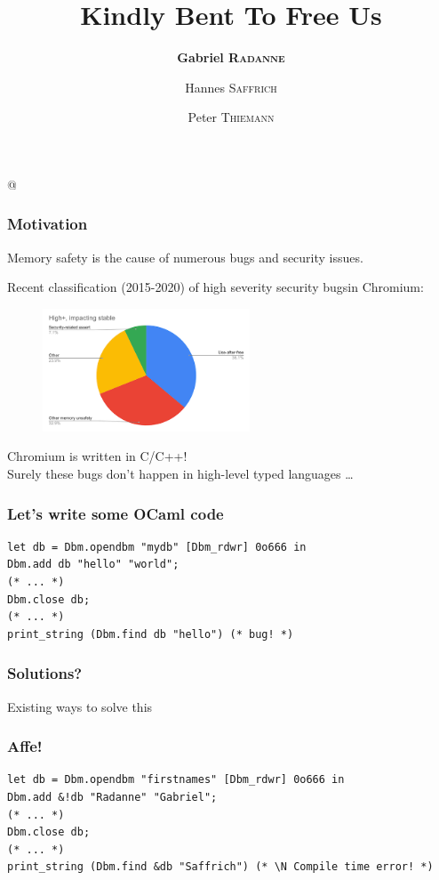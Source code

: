 \documentclass[aspectratio=169,dvipsnames,svgnames,10pt]{beamer}
\title{Kindly Bent To Free Us}
\author{\textbf{Gabriel \textsc{Radanne}}
  \and Hannes \textsc{Saffrich}
  \and Peter \textsc{Thiemann}}
\newcommand\N{{\color{Red}{\ding{56}}}}
\begin{document}
\lstMakeShortInline[keepspaces,basicstyle=\small\ttfamily]@

\frame[plain]{\titlepage}


\begin{frame}
  \frametitle{Motivation}

  Memory safety is the cause of numerous bugs and security issues.
  
  Recent classification (2015-2020) of \og high severity security bugs\fg in Chromium:

  \begin{figure}[h]
    \centering
    \includegraphics[width=0.55\textwidth]
    {chromium-use-after-free}
  \end{figure}

  \pause
  Chromium is written in C/C++!\\
  Surely these bugs don't happen in high-level typed languages \dots
  
\end{frame}

\begin{frame}[fragile]
  \frametitle{Let's write some OCaml code}

\begin{verbatim}
let db = Dbm.opendbm "mydb" [Dbm_rdwr] 0o666 in
Dbm.add db "hello" "world";
(* ... *)
Dbm.close db;
(* ... *)
print_string (Dbm.find db "hello") (* bug! *)
\end{verbatim}
  
\end{frame}

\begin{frame}
  \frametitle{Solutions?}

  Existing ways to solve this
  
\end{frame}

\begin{frame}[fragile]
  \frametitle{Affe!}

\begin{verbatim}
let db = Dbm.opendbm "firstnames" [Dbm_rdwr] 0o666 in
Dbm.add &!db "Radanne" "Gabriel";
(* ... *)
Dbm.close db;
(* ... *)
print_string (Dbm.find &db "Saffrich") (* \N Compile time error! *)
\end{verbatim}

  
\end{frame}
\end{document}
